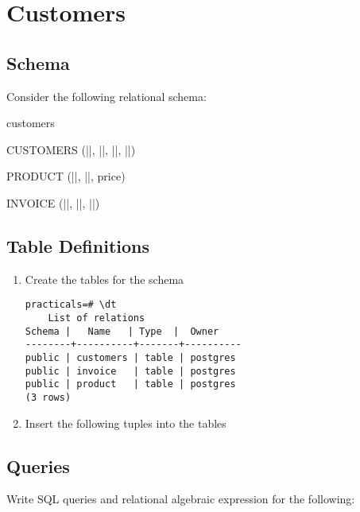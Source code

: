 \section{Customers}

\subsection{Schema}

Consider the following relational schema:

\begin{sqlSchema}{customers}

	CUSTOMERS (||, ||, ||, ||)

	PRODUCT (||, ||, price)

	INVOICE (||, ||, ||)

\end{sqlSchema}

\subsection{Table Definitions}

\begin{enumerate}[label=\alph*)]
	\item Create the tables for the schema


	      \begin{lstlisting}[style=output]
practicals=# \dt
    List of relations
Schema |   Name   | Type  |  Owner
--------+----------+-------+----------
public | customers | table | postgres
public | invoice   | table | postgres
public | product   | table | postgres
(3 rows)
          \end{lstlisting}

	\item Insert the following tuples into the tables


\end{enumerate}

\subsection{Queries}

Write SQL queries and relational algebraic expression for the following:


